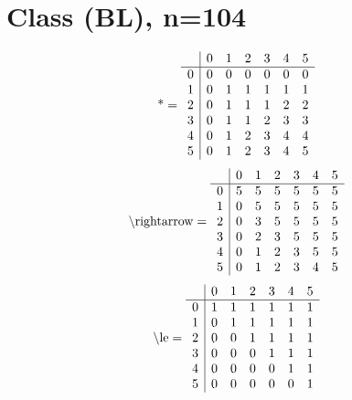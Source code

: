 \documentclass[11pt]{article}
\begin{document}
\section{Class (BL), n=104}
\[\text{*} = 
\begin{array}{r | r r r r r r}
 & 0 & 1 & 2 & 3 & 4 & 5 \\ \hline
0 & 0 & 0 & 0 & 0 & 0 & 0 \\
1 & 0 & 1 & 1 & 1 & 1 & 1 \\
2 & 0 & 1 & 1 & 1 & 2 & 2 \\
3 & 0 & 1 & 1 & 2 & 3 & 3 \\
4 & 0 & 1 & 2 & 3 & 4 & 4 \\
5 & 0 & 1 & 2 & 3 & 4 & 5 \\
\end{array}
\]
\[\text{\textbackslash rightarrow} = 
\begin{array}{r | r r r r r r}
 & 0 & 1 & 2 & 3 & 4 & 5 \\ \hline
0 & 5 & 5 & 5 & 5 & 5 & 5 \\
1 & 0 & 5 & 5 & 5 & 5 & 5 \\
2 & 0 & 3 & 5 & 5 & 5 & 5 \\
3 & 0 & 2 & 3 & 5 & 5 & 5 \\
4 & 0 & 1 & 2 & 3 & 5 & 5 \\
5 & 0 & 1 & 2 & 3 & 4 & 5 \\
\end{array}
\]
\[\text{\textbackslash le} = 
\begin{array}{r | r r r r r r}
 & 0 & 1 & 2 & 3 & 4 & 5 \\ \hline
0 & 1 & 1 & 1 & 1 & 1 & 1 \\
1 & 0 & 1 & 1 & 1 & 1 & 1 \\
2 & 0 & 0 & 1 & 1 & 1 & 1 \\
3 & 0 & 0 & 0 & 1 & 1 & 1 \\
4 & 0 & 0 & 0 & 0 & 1 & 1 \\
5 & 0 & 0 & 0 & 0 & 0 & 1 \\
\end{array}
\]
\end{document}
